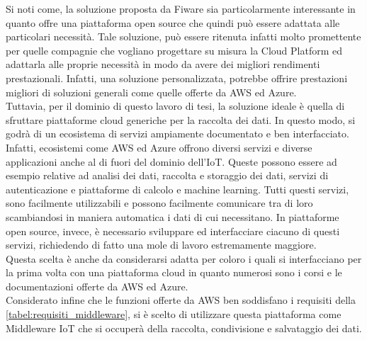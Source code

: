 Si noti come, la soluzione proposta da Fiware sia particolarmente interessante in quanto offre una piattaforma open source che quindi può essere adattata alle particolari necessità. Tale soluzione, può essere ritenuta infatti molto promettente per quelle compagnie che vogliano progettare su misura la Cloud Platform ed adattarla alle proprie necessità in modo da avere dei migliori rendimenti prestazionali. Infatti, una soluzione personalizzata, potrebbe offrire prestazioni migliori di soluzioni generali come quelle offerte da AWS ed Azure.\\
Tuttavia, per il dominio di questo lavoro di tesi, la soluzione ideale è quella di sfruttare piattaforme cloud generiche per la raccolta dei dati. In questo modo, si godrà di un ecosistema di servizi ampiamente documentato e ben interfacciato. Infatti, ecosistemi come AWS ed Azure offrono diversi servizi e diverse applicazioni anche al di fuori del dominio dell'IoT. Queste possono essere ad esempio relative ad analisi dei dati, raccolta e storaggio dei dati, servizi di autenticazione e piattaforme di calcolo e machine learning. Tutti questi servizi, sono facilmente utilizzabili e possono facilmente comunicare tra di loro scambiandosi in maniera automatica i dati di cui necessitano. In piattaforme open source, invece, è necessario sviluppare ed interfacciare ciacuno di questi servizi, richiedendo di fatto una mole di lavoro estremamente maggiore.\\
Questa scelta è anche da considerarsi adatta per coloro i quali si interfacciano per la prima volta con una piattaforma cloud in quanto numerosi sono i corsi e le documentazioni offerte da AWS ed Azure.\\
Considerato infine che le funzioni offerte da AWS ben soddisfano i requisiti della \autoref{tabel:requisiti_middleware}, si è scelto di utilizzare questa piattaforma come Middleware IoT che si occuperà della raccolta, condivisione e salvataggio dei dati.


